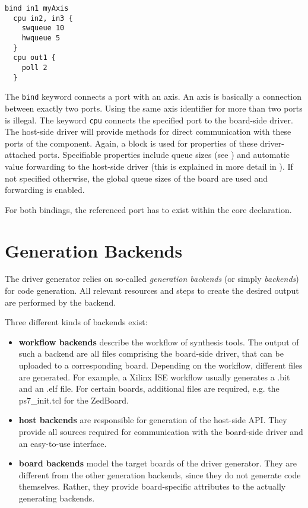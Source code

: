 \documentclass{report}
\begin{document}
\begin{lstlisting}[language=bdl]
  bind in1 myAxis
  cpu in2, in3 {
    swqueue 10
    hwqueue 5
  }
  cpu out1 {
    poll 2
  }
\end{lstlisting}

The \texttt{bind} keyword connects a port with an axis. An axis is basically a connection between exactly two ports. Using the same axis identifier for more than two ports is illegal.
The keyword \texttt{cpu} connects the specified port to the board-side driver. %
The host-side driver will provide methods for direct communication with these ports of the component.
Again, a block is used for properties of these driver-attached ports. Specifiable properties include queue sizes (see ) and automatic value forwarding to the host-side driver (this is explained in more detail in ). If not specified otherwise, the global queue sizes of the board are used and forwarding is enabled.

For both bindings, the referenced port has to exist within the core declaration.

\section{Generation Backends}
The driver generator relies on so-called \textit{generation backends} (or simply \textit{backends}) for code generation. All relevant resources and steps to create the desired output are performed by the backend.

Three different kinds of backends exist:
\begin{itemize} \itemsep1pt \parskip0pt 
\item \textbf{workflow backends} describe the workflow of synthesis tools. The output of such a backend are all files comprising the board-side driver, that can be uploaded to a corresponding board. Depending on the workflow, different files are generated. For example, a Xilinx ISE workflow usually generates a .bit and an .elf file. For certain boards, additional files are required, e.g. the ps7\_init.tcl for the ZedBoard.

\item \textbf{host backends} are responsible for generation of the host-side API. They provide all sources required for communication with the board-side driver and an easy-to-use interface. %

\item \textbf{board backends} model the target boards of the driver generator. They are different from the other generation backends, since they do not generate code themselves. Rather, they provide board-specific attributes to the actually generating backends.
\end{itemize}
\end{document}
